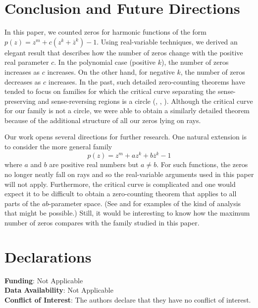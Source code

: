 \documentclass{amsart}
\renewcommand{\Re}{\operatorname{Re}}
\theoremstyle{definition}
\theoremstyle{remark}
\begin{document}

\section{Conclusion and Future Directions}

In this paper, we counted zeros for harmonic functions of the form $p(z) = z^m +c(z^k + \overline{z}^k) -1$. Using real-variable techniques, we derived an elegant result that describes how the number of zeros change with the positive real parameter $c$. In the polynomial case (positive $k$), the number of zeros increases as $c$ increases. On the other hand, for negative $k$, the number of zeros decreases as $c$ increases. In the past, such detailed zero-counting theorems have tended to focus on families for which the critical curve separating the sense-preserving and sense-reversing regions is a circle (\cite{BBDHS}, \cite{BDHPWW}, \cite{lee}). Although the critical curve for our family is not a circle, we were able to obtain a similarly detailed theorem because of the additional structure of all our zeros lying on rays. 

Our work opens several directions for further research. One natural extension is to consider the more general family
\[
p(z) = z^m +az^k +b\overline{z}^k -1
\]
where $a$ and $b$ are positive real numbers but $a \neq b$. For such functions, the zeros no longer neatly fall on rays and so the real-variable arguments used in this paper will not apply. Furthermore, the critical curve is complicated and one would expect it to be difficult to obtain a zero-counting theorem that applies to all parts of the $ab$-parameter space. (See \cite{work} and \cite{sam} for examples of the kind of analysis that might be possible.) Still, it would be interesting to know how the maximum number of zeros compares with the family studied in this paper. 

\section{Declarations}
\noindent \textbf{Funding}: Not Applicable \\
\textbf{Data Availability}: Not Applicable \\
\textbf{Conflict of Interest}: The authors declare that they have no conflict of interest.




\end{document}
